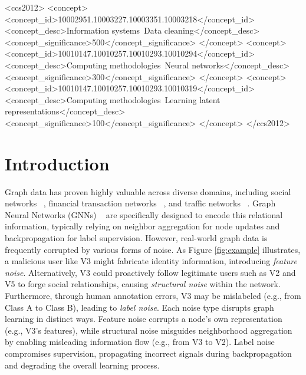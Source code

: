 \documentclass[sigconf, anonymous, review]{acmart}
\begin{document}
\begin{CCSXML}
<ccs2012>
   <concept>
       <concept_id>10002951.10003227.10003351.10003218</concept_id>
       <concept_desc>Information systems~Data cleaning</concept_desc>
       <concept_significance>500</concept_significance>
       </concept>
   <concept>
       <concept_id>10010147.10010257.10010293.10010294</concept_id>
       <concept_desc>Computing methodologies~Neural networks</concept_desc>
       <concept_significance>300</concept_significance>
       </concept>
   <concept>
       <concept_id>10010147.10010257.10010293.10010319</concept_id>
       <concept_desc>Computing methodologies~Learning latent representations</concept_desc>
       <concept_significance>100</concept_significance>
       </concept>
 </ccs2012>
\end{CCSXML}





\maketitle


\section{Introduction}
  Graph data has proven highly valuable across diverse domains, including social networks ~\cite{hamilton2017inductive}, financial transaction networks ~\cite{wang2019semi}, and traffic networks ~\cite{yu2017spatio}. Graph Neural Networks (GNNs) ~\cite{wu2020comprehensive} are specifically designed to encode this relational information, typically relying on neighbor aggregation for node updates and backpropagation for label supervision.
  However, real-world graph data is frequently corrupted by various forms of noise.
  As Figure \ref{fig:example} illustrates,  a malicious user like V3 might fabricate identity information, introducing \textit{feature noise}. Alternatively, V3 could proactively follow legitimate users such as V2 and V5 to forge social relationships, causing \textit{structural noise} within the network. Furthermore, through human annotation errors, V3 may be mislabeled (e.g., from Class A to Class B), leading to \textit{label noise}.
  Each noise type disrupts graph learning in distinct ways. Feature noise corrupts a node's own representation (e.g., V3's features), while structural noise misguides neighborhood aggregation by enabling misleading information flow (e.g., from V3 to V2). Label noise compromises supervision, propagating incorrect signals during backpropagation and degrading the overall learning process.
\end{document}
